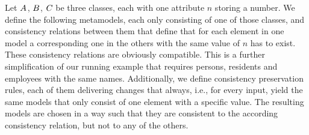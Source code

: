 Let $\class{A}{}$, $\class{B}{}$, $\class{C}{}$ be three classes, each with one attribute $n$ storing a number.
We define the following metamodels, each only consisting of one of those classes, and consistency relations between them that define that for each element in one model a corresponding one in the others with the same value of $n$ has to exist.
These consistency relations are obviously compatible.
This is a further simplification of our running example that requires persons, residents and employees with the same names.
Additionally, we define consistency preservation rules, each of them delivering changes that always, i.e., for every input, yield the same models that only consist of one element with a specific value.
The resulting models are chosen in a way such that they are consistent to the according consistency relation, but not to any of the others.
%

